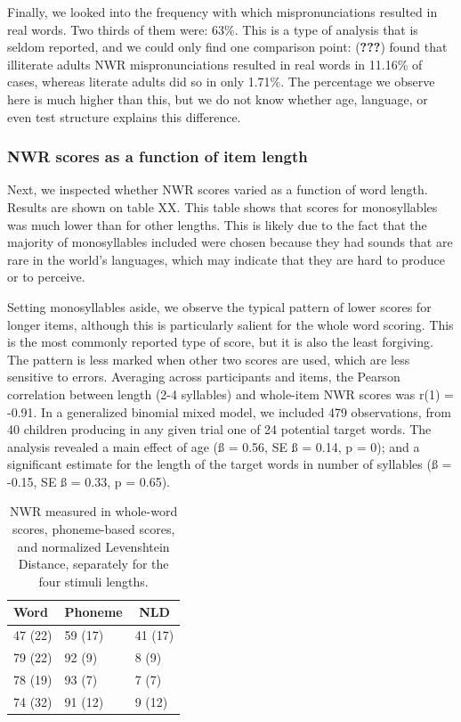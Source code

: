 \documentclass[english,,man,floatsintext]{apa6}
\begin{document}
Finally, we looked into the frequency with which mispronunciations
resulted in real words. Two thirds of them were: 63\%. This is a type of
analysis that is seldom reported, and we could only find one comparison
point: ({\textbf{???}}) found that illiterate adults NWR
mispronunciations resulted in real words in 11.16\% of cases, whereas
literate adults did so in only 1.71\%. The percentage we observe here is
much higher than this, but we do not know whether age, language, or even
test structure explains this difference.

\subsubsection{NWR scores as a function of item
length}\label{nwr-scores-as-a-function-of-item-length}

Next, we inspected whether NWR scores varied as a function of word
length. Results are shown on table XX. This table shows that scores for
monosyllables was much lower than for other lengths. This is likely due
to the fact that the majority of monosyllables included were chosen
because they had sounds that are rare in the world's languages, which
may indicate that they are hard to produce or to perceive.

Setting monosyllables aside, we observe the typical pattern of lower
scores for longer items, although this is particularly salient for the
whole word scoring. This is the most commonly reported type of score,
but it is also the least forgiving. The pattern is less marked when
other two scores are used, which are less sensitive to errors. Averaging
across participants and items, the Pearson correlation between length
(2-4 syllables) and whole-item NWR scores was r(1) = -0.91. In a
generalized binomial mixed model, we included 479 observations, from 40
children producing in any given trial one of 24 potential target words.
The analysis revealed a main effect of age (ß = 0.56, SE ß = 0.14, p =
0); and a significant estimate for the length of the target words in
number of syllables (ß = -0.15, SE ß = 0.33, p = 0.65).

\begin{table}[tbp]
\begin{center}
\begin{threeparttable}
\caption{\label{tab:tablength}NWR measured in whole-word scores, phoneme-based scores, and normalized Levenshtein Distance, separately for the four stimuli lengths.}
\begin{tabular}{lll}
\toprule
Word & \multicolumn{1}{c}{Phoneme} & \multicolumn{1}{c}{NLD}\\
\midrule
47 (22) & 59 (17) & 41 (17)\\
79 (22) & 92 (9) & 8 (9)\\
78 (19) & 93 (7) & 7 (7)\\
74 (32) & 91 (12) & 9 (12)\\
\bottomrule
\end{tabular}
\end{threeparttable}
\end{center}
\end{table}
\end{document}
